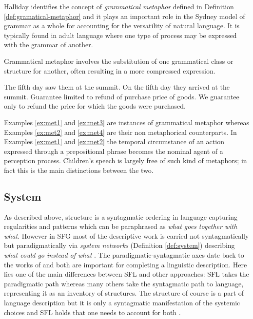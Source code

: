 Halliday identifies the concept of \textit{grammatical metaphor} defined in Definition \ref{def:gramatical-metaphor} and it plays an important role in the Sydney model of grammar as a whole for accounting for the versatility of natural language. It is typically found in adult language where one type of process may be expressed with the grammar of another.

\begin{definition}\label{def:gramatical-metaphor}
    Grammatical metaphor involves the substitution of one grammatical class or structure for another, often resulting in a more compressed expression.
\end{definition}

\begin{exe}
    \ex\label{ex:met1} The fifth day saw them at the summit.
    \ex\label{ex:met2} On the fifth day they arrived at the summit.
    \ex\label{ex:met3} Guarantee limited to refund of purchase price of goods.
    \ex\label{ex:met4} We guarantee only to refund the price for which the goods were purchased.
\end{exe}

Examples \ref{ex:met1} and \ref{ex:met3} are instances of grammatical metaphor whereas Examples \ref{ex:met2} and \ref{ex:met4} are their non metaphorical counterparts. In Examples \ref{ex:met1} and \ref{ex:met2} the temporal circumstance of an action expressed through a prepositional phrase becomes the nominal agent of a perception process. Children's speech is largely free of such kind of metaphors; in fact this is the main distinctions between the two. 

\subsection{System}
\label{sec:system}
As described above, structure is a syntagmatic ordering in language capturing regularities and patterns which can be paraphrased as \textit{what goes together with what}. However in SFG most of the descriptive work is carried not syntagmatically but paradigmatically via \textit{system networks} (Definition \ref{def:system}) describing \textit{what could go instead of what} \citep[22]{Halliday2013}. The paradigmatic-syntagmatic axes date back to the works of \citet{Saussure15} and both are important for completing a linguistic description. Here lies one of the main differences between SFL and other approaches: SFL takes the paradigmatic path whereas many others take the syntagmatic path to language, representing it as an inventory of structures.
The structure of course is a part of language description but it is only a syntagmatic manifestation of the systemic choices and SFL holds that one needs to account for both \citep[23]{Halliday2013}.

